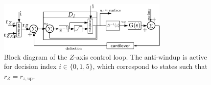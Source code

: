 \documentclass[twocolumn,oneside]{IEEEtran/IEEEtran}
\newcommand{\rzup}{\ensuremath{r_{z,\textrm{up}}}\xspace}
\begin{document}
\begin{figure}[t]
  \centering
  \includegraphics[width=0.75\textwidth]{figures/AFM_loop_z.pdf}
  \caption{Block diagram of the $Z$-axis control loop. The anti-windup is active
    for decision index $i\in\{0,1,5\}$, which correspond to states such that
    $r_Z=\rzup$.}
  \label{fig:afm_bd_dinv}
\end{figure}

%     
\end{document}

